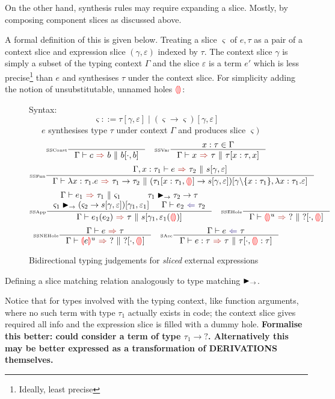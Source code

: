 On the other hand, synthesis rules may require expanding a slice. Mostly, by composing component slices as discussed above.
\par 
A formal definition of this is given below. Treating a slice $\varsigma$ of $e,\tau$ as a pair of a context slice and expression slice $(\gamma, \varepsilon)$ indexed by $\tau$. The context slice $\gamma$ is simply a subset of the typing context $\Gamma$ and the slice $\varepsilon$ is a term $e'$ which is less precise\footnote{Ideally, least precise} than $e$ and synthesises $\tau$ under the context slice. For simplicity adding the notion of unsubstitutable, unnamed holes ${\color{red}\llparenthesis}  {\color{red}\rrparenthesis}$: 

\begin{figure}[H]
\small
Syntax:
\[\varsigma ::= \tau[\gamma, \varepsilon] \mid (\varsigma \to \varsigma) [\gamma,\varepsilon]\]
\ \ \ $e$ synthesises type $\tau$ under context $\Gamma$ and produces slice $\varsigma)$
\tiny
\[\inference[\tiny SSConst]{}{\synthesisSlice{c}{b}{b[\cdot, b]}} \quad
\inference[\tiny SSVar]{x : \tau \in \Gamma}{\synthesisSlice{x}{\tau}{\tau[x:\tau,x]}}\]
\[ 
\inference[\tiny SSFun]{\synthesisSlice[\Gamma,x:\tau_1]{e}{\tau_2}{s[\gamma, \varepsilon]}}{\synthesisSlice{\lambda x:\tau_1.e}{\tau_1 \to \tau_2}{(\tau_1[x:\tau_1,\hole] \to s[\gamma, \varepsilon])[\gamma\backslash\{x:\tau_1\},\lambda x:\tau_1. \varepsilon]}}
\]
\[
\inference[\tiny SSApp]{\synthesisSlice{e_1}{\tau_1}{\varsigma_1} & \tau_1 \funmatch \tau_2 \to \tau \\
\varsigma_1 \funmatch (\varsigma_2 \to s[\gamma,\varepsilon])[\gamma_1, \varepsilon_1] & \analysis{e_2}{\tau_2}}{\synthesisSlice{e_1(e_2)}{\tau}{s[\gamma_1, \varepsilon_1(\hole)]}} \quad 
\inference[\tiny SSEHole]{}{\synthesisSlice{\hole^u}{?}{?[\cdot, \hole]}} 
\]
\[
\inference[\tiny SSNEHole]{\synthesis{e}{\tau}}{\synthesisSlice{\hole[e]^u}{?}{?[\cdot, \hole]}}\quad 
\inference[\tiny SAsc]{\analysis{e}{\tau}}{\synthesisSlice{e : \tau}{\tau}{\tau[\cdot, \hole : \tau]}}
\]
\caption{Bidirectional typing judgements for \textit{sliced} external expressions}
\label{fig:typingsliced}
\end{figure}
Defining a slice matching relation analogously to type matching $\blacktriangleright_\rightarrow$.\par
Notice that for types involved with the typing context, like function arguments, where no such term with type $\tau_1$ actually exists in code; the context slice gives required all info and the expression slice is filled with a dummy hole. \textbf{Formalise this better: could consider a term of type $\tau_1 \to ?$. Alternatively this may be better expressed as a transformation of DERIVATIONS themselves.}\par 


